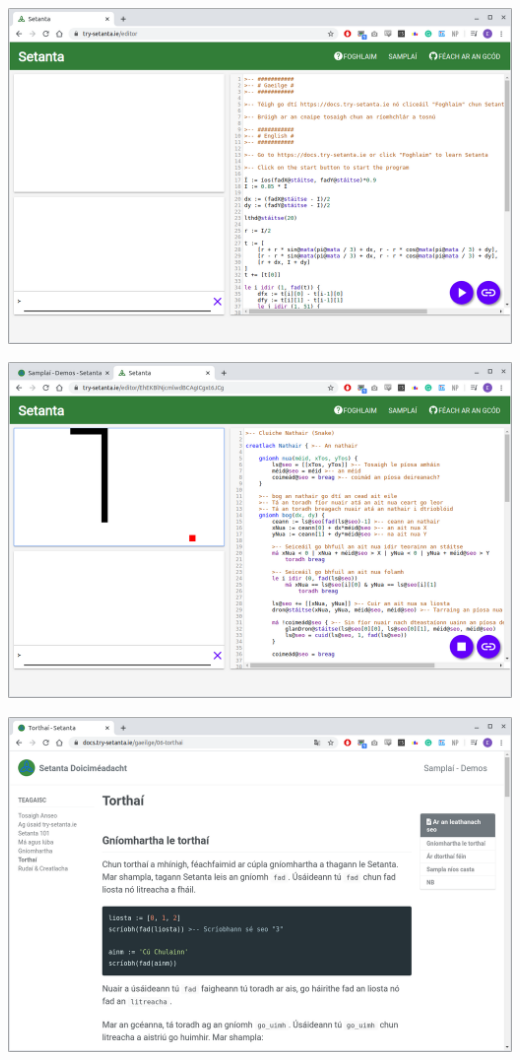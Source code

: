\begin{center}
    \includegraphics[scale=0.36]{app4assets/editor-desktop}
    \label{screenshot:editor-desktop}
\end{center}

\begin{center}
    \includegraphics[scale=0.36]{app4assets/snake-desktop}
    \label{screenshot:snake-desktop}
\end{center}

\begin{center}
    \includegraphics[scale=0.36]{app4assets/docs-ga-desktop}
    \label{screenshot:docs-ga-desktop}
\end{center}%
%
